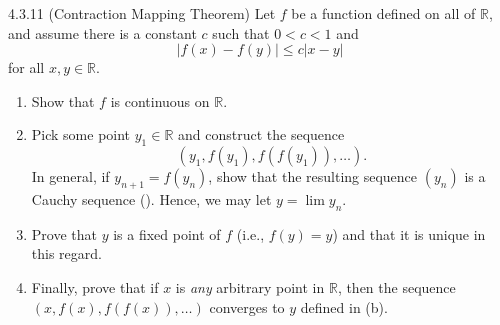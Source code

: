 \begin{exercise}
    {4.3.11 (Contraction Mapping Theorem)} Let \(f\) be a function defined on all of \(\mathbb{R}\), and assume there is a constant \(c\) such that \(0 < c < 1\) and
    \[
        |f(x) - f(y)| \leq c|x - y|
    \]
    for all \(x, y \in \mathbb{R}\).
    \begin{enumerate}
        \item Show that \(f\) is continuous on \(\mathbb{R}\).
        \item Pick some point \(y_1 \in \mathbb{R}\) and construct the sequence 
        \[
            (y_1, f(y_1), f(f(y_1)), \ldots).
        \]
        In general, if \(y_{n+1} = f(y_n)\), show that the resulting sequence \((y_n)\) is a Cauchy sequence (). Hence, we may let \(y = \lim y_n\).
        \item Prove that \(y\) is a fixed point of \(f\) (i.e., \(f(y) = y\)) and that it is unique in this regard.
        \item Finally, prove that if \(x\) is \textit{any} arbitrary point in \(\mathbb{R}\), then the sequence \((x,f(x),f(f(x)),\dots)\) converges to \(y\) defined in (b).
    \end{enumerate}
\end{exercise}

